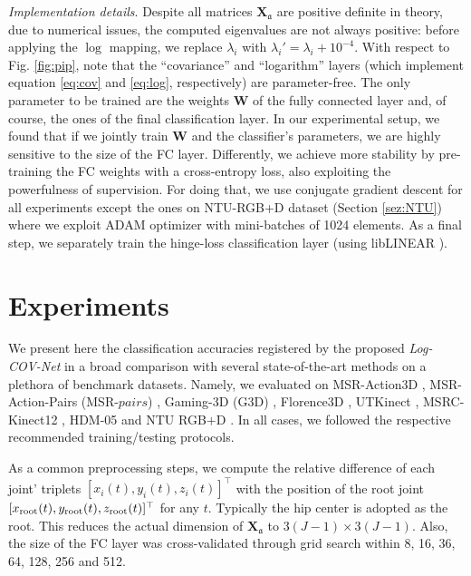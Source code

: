 \documentclass[10pt,twocolumn]{article}
\begin{document}
\emph{Implementation details}. Despite all matrices $\mathbf{X}_\mathfrak{a}$ are positive definite in theory, due to numerical issues, the computed eigenvalues are not always positive: before applying the $\log$ mapping, we replace $\lambda_i$ with $\lambda_i' = \lambda_i + 10^{-4}$. 
With respect to Fig. \ref{fig:pip}, note that the ``covariance'' and ``logarithm'' layers (which implement equation \eqref{eq:cov} and \eqref{eq:log}, respectively) are parameter-free. The only parameter to be trained are the weights $\mathbf{W}$ of the fully connected layer and, of course, the ones of the final classification layer. In our experimental setup, we found that if we jointly train $\mathbf{W}$ and the classifier's parameters, we are highly sensitive to the size of the FC layer. Differently, we achieve more stability by pre-training the FC weights with a cross-entropy loss, also exploiting the powerfulness of supervision. For doing that, we use conjugate gradient descent for all experiments except the ones on NTU-RGB+D \cite{Shahroudy:CVPR16} dataset (Section \ref{sez:NTU}) where we exploit ADAM optimizer with mini-batches of 1024 elements. As a final step, we separately train the hinge-loss classification layer (using libLINEAR \cite{liblinear}). 

\section{Experiments}\label{sez:e}

We present here the classification accuracies registered by the proposed \textit{Log-COV-Net} in a broad comparison with several state-of-the-art methods on a plethora of benchmark datasets. Namely, we evaluated on  MSR-Action3D \cite{Action3D}, MSR-Action-Pairs (MSR-$pairs$) \cite{MSRPairs},  Gaming-3D (G3D) \cite{G3D}, Florence3D \cite{Florence3D}, UTKinect \cite{UTKinect},  MSRC-Kinect12 \cite{MSRC}, HDM-05 \cite{HDM-05} and NTU RGB$+$D \cite{Shahroudy:CVPR16}. In all cases, we followed the respective recommended training/testing protocols.

As a common preprocessing steps, we compute the relative difference of each joint' triplets $[x_i(t),y_i(t),z_i(t)]^\top$ with the position of the root joint $[x_{\rm root}(t),y_{\rm root}(t),z_{\rm root}(t)]^\top$ for any $t$. Typically the hip center is adopted as the root. This reduces the actual dimension of $\mathbf{X}_\mathfrak{a}$ to $3(J-1) \times 3(J-1)$. Also, the size of the FC layer was cross-validated through grid search within 8, 16, 36, 64, 128, 256 and 512. 
\end{document}
